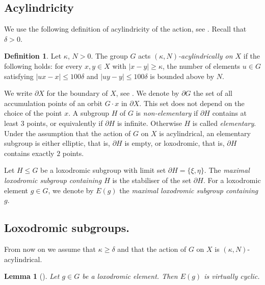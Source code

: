 \documentclass[leqno,a4paper,10pt]{amsart}
\theoremstyle{plain}
\newtheorem{lem}[thm]{Lemma}
\theoremstyle{definition}
\newtheorem{df}[thm]{Definition}
\theoremstyle{remark}
\let\le\leqslant
\let\ge\geqslant
\begin{document}
\subsection{Acylindricity}
\label{subsec:group-action}


We use the following definition of acylindricity of the action, see \cite[Proposition~5.31]{dahmani_hyperbolically_2017}. Recall that $\delta>0$.

\begin{df}
	\label{def: acylindricity}
	Let $\kappa$, $N>0$. The group $G$ acts \emph{$(\kappa,N)$-acylindrically on $X$} if the following holds: for every $x, y \in X$ with $|x-y|\ge \kappa$, the number of elements $u \in G$ satisfying $|ux-x| \le 100\delta$ and $|uy-y| \le 100\delta$ is bounded above by $N$.
\end{df}
	

 We write $\partial X$ for the boundary of $X$, see  \cite[Chapitre~2, Définition~1.1]{coornaert_geometrie_1990}.
We denote by $\partial G$ the set of all accumulation points of an orbit $G \cdot x$ in $\partial X$.
This set does not depend on the choice of the point $x$. A subgroup $H$ of $G$ is \emph{non-elementary} if $\partial H$ contains at least $3$ points, or equivalently if $\partial H$ is infinite. Otherwise $H$ is called \emph{elementary}. Under the assumption that the action of $G$ on $X$ is acylindrical, an elementary subgroup is either elliptic, that is, $\partial H$ is empty, or loxodromic, that is, $\partial H$ contains exactly $2$ points. 

Let $H\le G$ be a loxodromic subgroup with limit set $\partial H=\{ \xi,\eta \}$. 
The \emph{maximal loxodromic subgroup containing $H$} is the stabiliser of the set $\partial H$. For a loxodromic element $g\in G$, we denote by $E(g)$ the \emph{maximal loxodromic subgroup containing $g$}. 
\subsection{Loxodromic subgroups.}




From now on we assume that $\kappa\geqslant \delta$ and that the action of $G$ on $X$ is $(\kappa,N)$-acylindrical. 


\begin{lem}[]
	\label{lem:virtually cyclic elementary closure}   
	Let $g\in G$ be a loxodromic element. Then $E(g)$ is virtually cyclic.
\end{lem}
\end{document}
